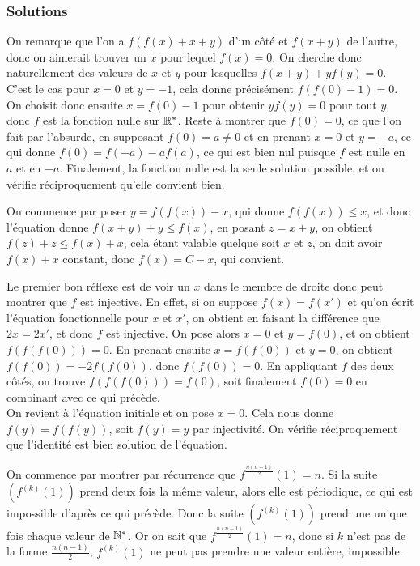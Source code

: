 

\subsubsection{Solutions}

\begin{sol}
On remarque que l'on a $f(f(x)+x+y)$ d'un côté et $f(x+y)$ de l'autre, donc on aimerait trouver un $x$ pour lequel $f(x)=0$. On cherche donc naturellement des valeurs de $x$ et $y$ pour lesquelles $f(x+y)+yf(y)=0$. C'est le cas pour $x=0$ et $y=-1$, cela donne précisément $f(f(0)-1)=0$. On choisit donc ensuite $x=f(0)-1$ pour obtenir $yf(y)=0$ pour tout $y$, donc $f$ est la fonction nulle sur $\mathbb R^*$. Reste à montrer que $f(0)=0$, ce que l'on fait par l'absurde, en supposant $f(0)=a\ne 0$ et en prenant $x=0$ et $y=-a$, ce qui donne $f(0)=f(-a)-af(a)$, ce qui est bien nul puisque $f$ est nulle en $a$ et en $-a$. Finalement, la fonction nulle est la seule solution possible, et on vérifie réciproquement qu'elle convient bien.
\end{sol}


\begin{sol}
On commence par poser $y=f(f(x))-x$, qui donne $f(f(x))\le x$, et donc l'équation donne $f(x+y)+y\le f(x)$, en posant $z=x+y$, on obtient $f(z)+z\le f(x)+x$, cela étant valable quelque soit $x$ et $z$, on doit avoir $f(x)+x$ constant, donc $f(x)=C-x$, qui convient.
\end{sol}

\begin{sol}
Le premier bon réflexe est de voir un $x$ dans le membre de droite donc peut montrer que $f$ est injective. En effet, si on suppose $f(x)=f(x')$ et qu'on écrit l'équation fonctionnelle pour $x$ et $x'$, on obtient en faisant la différence que $2x=2x'$, et donc $f$ est injective. On pose alors $x=0$ et $y=f(0)$, et on obtient $f(f(f(0)))=0$. En prenant ensuite $x=f(f(0))$ et $y=0$, on obtient $f(f(0))=-2f(f(0))$, donc $f(f(0))=0$. En appliquant $f$ des deux côtés, on trouve $f(f(f(0)))=f(0)$, soit finalement $f(0)=0$ en combinant avec ce qui précède. \\
On revient à l'équation initiale et on pose $x=0$. Cela nous donne $f(y)=f(f(y))$, soit $f(y)=y$ par injectivité. On vérifie réciproquement que l'identité est bien solution de l'équation.
\end{sol}


\begin{sol}
On commence par montrer par récurrence que $f^{\frac{n(n-1)}{2}}(1) = n$. Si la suite $(f^{(k)}(1))$ prend deux fois la même valeur, alors elle est périodique, ce qui est impossible d'après ce qui précède. Donc la suite $(f^{(k)}(1))$ prend une unique fois chaque valeur de $\mathbb N^*$. Or on sait que $f^{\frac{n(n-1)}{2}}(1)=n$, donc si $k$ n'est pas de la forme $\displaystyle\frac{n(n-1)}{2}$, $f^{(k)}(1)$ ne peut pas prendre une valeur entière, impossible.
\end{sol}


